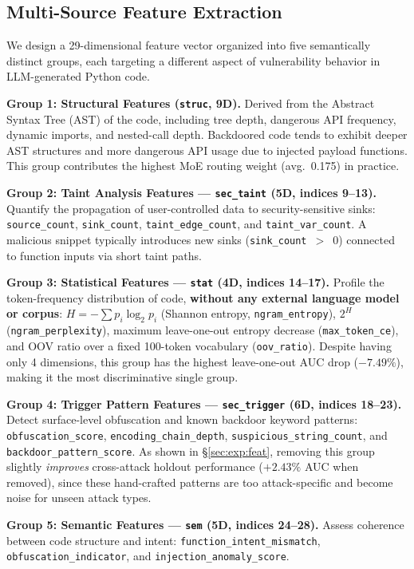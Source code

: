 ﻿\documentclass[sigconf,review,anonymous]{acmart}
\begin{document}
\subsection{Multi-Source Feature Extraction}
\label{sec:feat}

We design a 29-dimensional feature vector organized into five semantically
distinct groups, each targeting a different aspect of vulnerability behavior in
LLM-generated Python code.

\textbf{Group 1: Structural Features (\texttt{struc}, 9D).}
Derived from the Abstract Syntax Tree (AST) of the code, including tree depth,
dangerous API frequency, dynamic imports, and nested-call depth.
Backdoored code tends to exhibit deeper AST structures and more dangerous API
usage due to injected payload functions.
This group contributes the highest MoE routing weight (avg.\ 0.175) in practice.

\textbf{Group 2: Taint Analysis Features --- \texttt{sec\_taint} (5D, indices 9--13).}
Quantify the propagation of user-controlled data to security-sensitive sinks:
\texttt{source\_count}, \texttt{sink\_count}, \texttt{taint\_edge\_count}, and \texttt{taint\_var\_count}.
A malicious snippet typically introduces new sinks (\texttt{sink\_count}~$>$~0)
connected to function inputs via short taint paths.

\textbf{Group 3: Statistical Features --- \texttt{stat} (4D, indices 14--17).}
Profile the token-frequency distribution of code, \textbf{without any external
language model or corpus}:
$H{=}{-}\sum p_i \log_2 p_i$ (Shannon entropy, \texttt{ngram\_entropy}),
$2^H$ (\texttt{ngram\_perplexity}),
maximum leave-one-out entropy decrease (\texttt{max\_token\_ce}),
and OOV ratio over a fixed 100-token vocabulary (\texttt{oov\_ratio}).
Despite having only 4 dimensions, this group has the highest leave-one-out AUC
drop ($-7.49\%$), making it the most discriminative single group.

\textbf{Group 4: Trigger Pattern Features --- \texttt{sec\_trigger} (6D, indices 18--23).}
Detect surface-level obfuscation and known backdoor keyword patterns:
\texttt{obfuscation\_score}, \texttt{encoding\_chain\_depth}, \texttt{suspicious\_string\_count}, and \texttt{backdoor\_pattern\_score}.
As shown in \S\ref{sec:exp:feat}, removing this group slightly \emph{improves}
cross-attack holdout performance ($+2.43\%$ AUC when removed), since these hand-crafted patterns
are too attack-specific and become noise for unseen attack types.

\textbf{Group 5: Semantic Features --- \texttt{sem} (5D, indices 24--28).}
Assess coherence between code structure and intent:
\texttt{function\_intent\_mismatch}, \texttt{obfuscation\_indicator}, and \texttt{injection\_anomaly\_score}.
\end{document}
